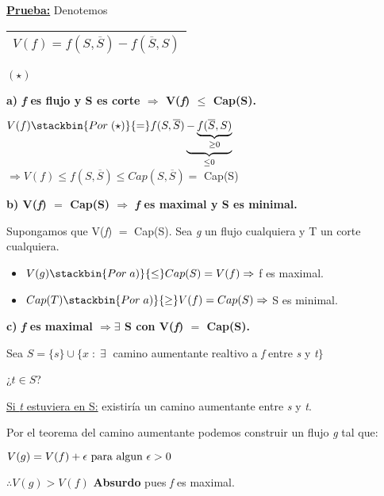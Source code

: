 \documentclass[12pt,a4paper]{report}
\begin{document}
		\textbf{\underline{Prueba:}} Denotemos \begin{tabular}{|c|} \hline $V(\textit{f}) = f(S, \overline{S}) - f(\overline{S},S)$ \\ \hline \end{tabular} $(\star)$

		\vspace{5mm}
		\textbf{a) \textit{f} es flujo y S es corte $\Rightarrow$ V(\textit{f}) $\leq$ Cap(S).}

			\begin{center}
				$V(f) \stackbin{Por \; (\star)}{=} f(S, \overline{S})\underbrace{-\underbrace{f(\overline{S}, S)}_{\geq 0}}_{\leq 0}$ \\

				\vspace{5mm}
				$\Rightarrow V(f ) \leq f(S, \overline{S}) \leq Cap(S, \overline{S}) =$ Cap(S)
			\end{center}

		\textbf{b) V(\textit{f}) $=$ Cap(S) $\Rightarrow$ \textit{f} es maximal y S es minimal.}

			\vspace{2mm}
			Supongamos que V(\textit{f}) $=$ Cap(S). Sea \textit{g} un flujo cualquiera y T un corte cualquiera.
			\begin{itemize}
				\item $V(g) \stackbin{Por \; a)}{\leq} Cap(S) = V(f) \Rightarrow$ f es maximal.
				\item $Cap(T) \stackbin{Por \; a)}{\geq} V(f) = Cap(S) \Rightarrow$ S es minimal.
			\end{itemize}

		\vspace{5mm}
		\textbf{c) \textit{f} es maximal $\Rightarrow \exists$ S con V(\textit{f}) $=$ Cap(S).}

			\vspace{2mm}
			Sea $S = \{s\} \cup \{x \; : \; \exists \;$ camino aumentante realtivo a \textit{f} entre \textit{s} y \textit{t}$\}$

			\vspace{5mm}
			¿$t \in S$?

			\underline{Si \textit{t} estuviera en S:} existiría un camino aumentante entre \textit{s} y \textit{t}.

				Por el teorema del camino aumentante podemos construir un  flujo \textit{g} tal que:
				\begin{center}
					$V(g) = V(f) + \epsilon \textup{ para algun } \epsilon > 0$

					$\therefore V(g) > V(f)$ \textbf{Absurdo} pues \textit{f} es maximal.
				\end{center}
\end{document}
